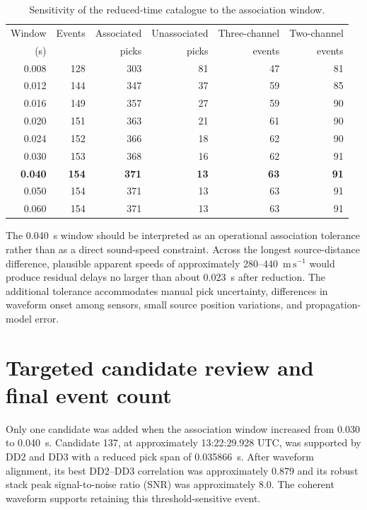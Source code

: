 \documentclass[11pt]{article}
\begin{document}
\begin{table}[htbp]
\centering
\caption{Sensitivity of the reduced-time catalogue to the association window.}
\label{tab:window_sensitivity}
\begin{tabular}{rrrrrr}
\toprule
Window & Events & Associated & Unassociated & Three-channel & Two-channel \\
(s) & & picks & picks & events & events \\
\midrule
0.008 & 128 & 303 & 81 & 47 & 81 \\
0.012 & 144 & 347 & 37 & 59 & 85 \\
0.016 & 149 & 357 & 27 & 59 & 90 \\
0.020 & 151 & 363 & 21 & 61 & 90 \\
0.024 & 152 & 366 & 18 & 62 & 90 \\
0.030 & 153 & 368 & 16 & 62 & 91 \\
\textbf{0.040} & \textbf{154} & \textbf{371} & \textbf{13} & \textbf{63} & \textbf{91} \\
0.050 & 154 & 371 & 13 & 63 & 91 \\
0.060 & 154 & 371 & 13 & 63 & 91 \\
\bottomrule
\end{tabular}
\end{table}

The 0.040~s window should be interpreted as an operational association
tolerance rather than as a direct sound-speed constraint. Across the longest
source-distance difference, plausible apparent speeds of approximately
280--440~\(\mathrm{m\,s^{-1}}\) would produce residual delays no larger than
about 0.023~s after reduction. The additional tolerance accommodates manual
pick uncertainty, differences in waveform onset among sensors, small source
position variations, and propagation-model error.

\section{Targeted candidate review and final event count}

Only one candidate was added when the association window increased from 0.030
to 0.040~s. Candidate 137, at approximately 13:22:29.928 UTC, was supported by
DD2 and DD3 with a reduced pick span of 0.035866~s. After waveform alignment,
its best DD2--DD3 correlation was approximately 0.879 and its robust stack
peak signal-to-noise ratio (SNR) was approximately 8.0. The coherent waveform
supports retaining this threshold-sensitive event.
\end{document}
